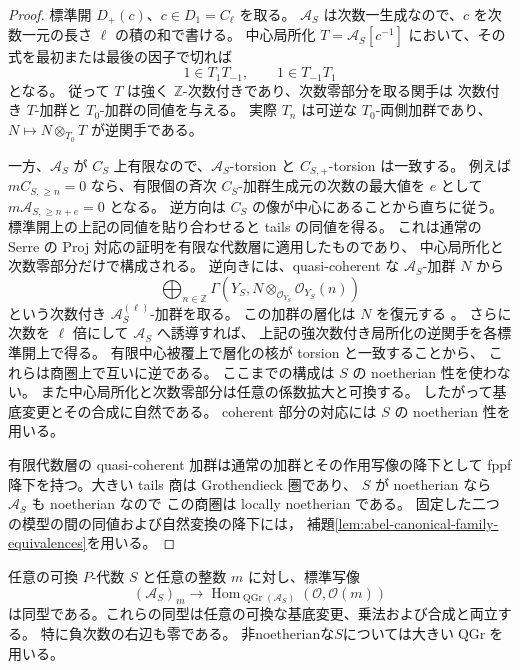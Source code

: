 \begin{proof}
標準開 $D_+(c)$、$c\in D_1=C_\ell$ を取る。
$\mathcal A_S$ は次数一生成なので、$c$ を次数一元の長さ $\ell$ の積の和で書ける。
中心局所化 $T=\mathcal A_S[c^{-1}]$ において、その式を最初または最後の因子で切れば
\[
 1\in T_1T_{-1},\qquad 1\in T_{-1}T_1
\]
となる。
従って $T$ は強く $\mathbb Z$-次数付きであり、次数零部分を取る関手は
次数付き $T$-加群と $T_0$-加群の同値を与える。
実際 $T_n$ は可逆な $T_0$-両側加群であり、
$N\mapsto N\otimes_{T_0}T$ が逆関手である。

一方、$\mathcal A_S$ が $C_S$ 上有限なので、$\mathcal A_S$-torsion と
$C_{S,+}$-torsion は一致する。
例えば $mC_{S,\geq n}=0$ なら、有限個の斉次 $C_S$-加群生成元の次数の最大値を $e$ として
$m\mathcal A_{S,\geq n+e}=0$ となる。
逆方向は $C_S$ の像が中心にあることから直ちに従う。
標準開上の上記の同値を貼り合わせると tails の同値を得る。
これは通常の Serre の Proj 対応の証明を有限な代数層に適用したものであり、
中心局所化と次数零部分だけで構成される。
逆向きには、quasi-coherent な $\mathscr A_S$-加群 $N$ から
\[
 \bigoplus_{n\in\mathbb Z}
 \Gamma(Y_S,N\otimes_{\mathcal O_{Y_S}}\mathcal O_{Y_S}(n))
\]
という次数付き $\mathcal A_S^{(\ell)}$-加群を取る。
この加群の層化は $N$ を復元する
\cite[Lemma~28.29.5, Tag~0AG5]{StacksProj}。
さらに次数を $\ell$ 倍にして $\mathcal A_S$ へ誘導すれば、
上記の強次数付き局所化の逆関手を各標準開上で得る。
有限中心被覆上で層化の核が torsion と一致することから、
これらは商圏上で互いに逆である。
ここまでの構成は $S$ の noetherian 性を使わない。
また中心局所化と次数零部分は任意の係数拡大と可換する。
したがって基底変更とその合成に自然である。
coherent 部分の対応には $S$ の noetherian 性を用いる。

有限代数層の quasi-coherent 加群は通常の加群とその作用写像の降下として
fppf 降下を持つ。大きい tails 商は Grothendieck 圏であり、
$S$ が noetherian なら $\mathcal A_S$ も noetherian なので
この商圏は locally noetherian である。
固定した二つの模型の間の同値および自然変換の降下には，
補題\ref{lem:abel-canonical-family-equivalences}を用いる。
\end{proof}

\begin{theorem}
\label{thm:central-model-universal-sections}
任意の可換 $P$-代数 $S$ と任意の整数 $m$ に対し、標準写像
\[
 (\mathcal A_S)_m\longrightarrow
 \operatorname{Hom}_{\operatorname{QGr}(\mathcal A_S)}
 (\mathcal O,\mathcal O(m))
\]
は同型である。これらの同型は任意の可換な基底変更、乗法および合成と両立する。
特に負次数の右辺も零である。
非noetherianな$S$については大きい$\operatorname{QGr}$を用いる。
\end{theorem}

